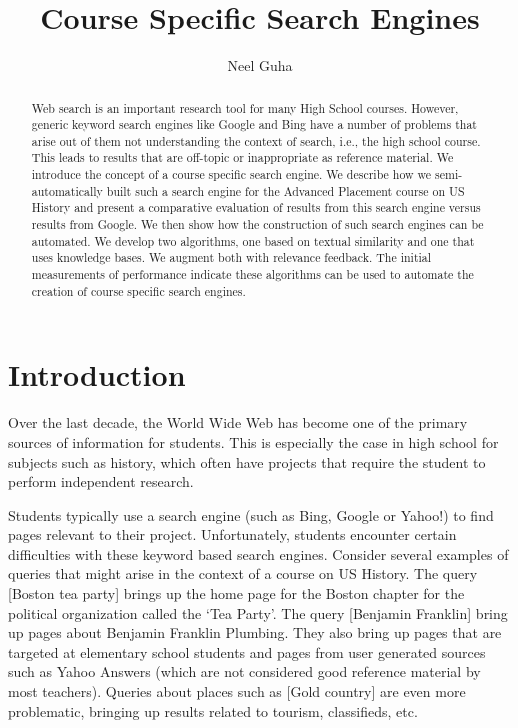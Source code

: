 \documentclass{acm_proc_article-sp}
\begin{document}
\title{Course Specific Search Engines}

\author{
  \alignauthor
  Neel Guha \\
}

\maketitle
\begin{abstract}
Web search is an important research tool for many High School courses. However,
generic keyword search engines like Google and Bing have a number of problems
that arise out of them not understanding the context of search, i.e., the high
school course. This leads to results that are off-topic or inappropriate as
reference material. We introduce the concept of a course specific search
engine. We describe how we semi-automatically built such a search engine for the
Advanced Placement course on US History and present a comparative evaluation of
results from this search engine versus results from Google. We then show how the
construction of such search engines can be automated. We develop two algorithms,
one based on textual similarity and one that uses knowledge bases. We augment
both with relevance feedback. The initial measurements of performance indicate
these algorithms can be used to automate the creation of course specific search
engines.    
\end{abstract}

\section{Introduction}

Over the last decade, the World Wide Web has become one of the primary sources
of information for students. This is especially the case in high school for
subjects such as history, which often have projects that require the student to
perform independent research. 

Students typically use a search engine (such as Bing, Google or Yahoo!) to find
pages relevant to their project. Unfortunately, students encounter certain
difficulties with these keyword based search engines.  Consider several examples
of queries that might arise in the context of a course on US History. The query
[Boston tea party] brings up the home page for the Boston chapter for the
political organization called the ‘Tea Party’. The query [Benjamin Franklin]
bring up pages about Benjamin Franklin Plumbing. They also bring up pages that
are targeted at elementary school students and pages from user generated sources
such as Yahoo Answers  (which are not considered good reference material by most
teachers). Queries about places such as [Gold country] are even more
problematic, bringing up results related to tourism, classifieds, etc. 
\end{document}
